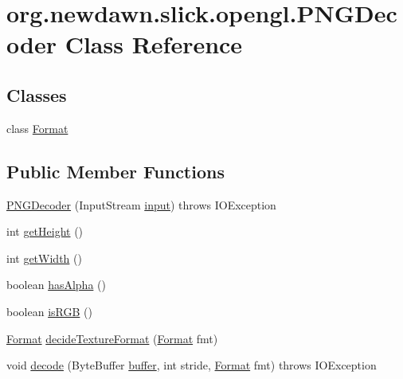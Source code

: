 \hypertarget{classorg_1_1newdawn_1_1slick_1_1opengl_1_1_p_n_g_decoder}{}\section{org.\+newdawn.\+slick.\+opengl.\+P\+N\+G\+Decoder Class Reference}
\label{classorg_1_1newdawn_1_1slick_1_1opengl_1_1_p_n_g_decoder}
\subsection*{Classes}
\begin{DoxyCompactItemize}
\item 
class \mbox{\hyperlink{classorg_1_1newdawn_1_1slick_1_1opengl_1_1_p_n_g_decoder_1_1_format}{Format}}
\end{DoxyCompactItemize}
\subsection*{Public Member Functions}
\begin{DoxyCompactItemize}
\item 
\mbox{\hyperlink{classorg_1_1newdawn_1_1slick_1_1opengl_1_1_p_n_g_decoder_ae3e7f9921e7a1e1ad605cff63100d98a}{P\+N\+G\+Decoder}} (Input\+Stream \mbox{\hyperlink{classorg_1_1newdawn_1_1slick_1_1opengl_1_1_p_n_g_decoder_a5714583b8e4e668d86f45065cda6e20b}{input}})  throws I\+O\+Exception 
\item 
int \mbox{\hyperlink{classorg_1_1newdawn_1_1slick_1_1opengl_1_1_p_n_g_decoder_a1972b2918da3ba0701b1f3694ae31e60}{get\+Height}} ()
\item 
int \mbox{\hyperlink{classorg_1_1newdawn_1_1slick_1_1opengl_1_1_p_n_g_decoder_a7e93e69b81d656bbec28e6971898657e}{get\+Width}} ()
\item 
boolean \mbox{\hyperlink{classorg_1_1newdawn_1_1slick_1_1opengl_1_1_p_n_g_decoder_a03f7526d0ae6a3cbedb4cd9745462330}{has\+Alpha}} ()
\item 
boolean \mbox{\hyperlink{classorg_1_1newdawn_1_1slick_1_1opengl_1_1_p_n_g_decoder_a04a6ed620e9af0576fc0ba93d418f017}{is\+R\+GB}} ()
\item 
\mbox{\hyperlink{classorg_1_1newdawn_1_1slick_1_1opengl_1_1_p_n_g_decoder_1_1_format}{Format}} \mbox{\hyperlink{classorg_1_1newdawn_1_1slick_1_1opengl_1_1_p_n_g_decoder_aba256a6afc6ba9bd28f8244d7a79d09d}{decide\+Texture\+Format}} (\mbox{\hyperlink{classorg_1_1newdawn_1_1slick_1_1opengl_1_1_p_n_g_decoder_1_1_format}{Format}} fmt)
\item 
void \mbox{\hyperlink{classorg_1_1newdawn_1_1slick_1_1opengl_1_1_p_n_g_decoder_ad9b6eabeb88368645325bfb634a133b6}{decode}} (Byte\+Buffer \mbox{\hyperlink{classorg_1_1newdawn_1_1slick_1_1opengl_1_1_p_n_g_decoder_ae205f9222586a2bc01a8a240c5c210ad}{buffer}}, int stride, \mbox{\hyperlink{classorg_1_1newdawn_1_1slick_1_1opengl_1_1_p_n_g_decoder_1_1_format}{Format}} fmt)  throws I\+O\+Exception 
\end{DoxyCompactItemize}
